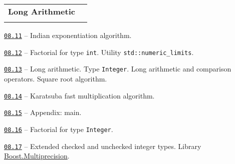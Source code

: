 \documentclass[a4paper,12pt]{article}
\renewenvironment{itemize}
{
    \begin{list}{\labelitemi}
    {
      \setlength{\topsep}{0pt}
      \setlength{\partopsep}{0pt}
      \setlength{\parskip}{0pt}
      \setlength{\itemsep}{0pt}
      \setlength{\parsep}{0pt}
      \setlength{\leftmargin}{14.5pt}
    }
}{\end{list}}
\begin{document}
\bigskip\medskip

\begin{tabular}{!{\vrule width 1pt}L{3.3cm}!{\vrule width 1pt}L{15.7cm}!{\vrule width 0pt}} 


\textbf{Long Arithmetic} & \\


\end{tabular}

\medskip\smallskip

\begin{itemize}

    \item \href{https://github.com/i-s-m-mipt/Education/blob/master/projects/examples/source/08.11.cpp}{\texttt{08.11}} -- Indian exponentiation algorithm.

    \smallskip

    \item \href{https://github.com/i-s-m-mipt/Education/blob/master/projects/examples/source/08.12.cpp}{\texttt{08.12}} -- Factorial for type \lstinline{int}. Utility \lstinline{std::numeric_limits}.

    \smallskip

    \item \href{https://github.com/i-s-m-mipt/Education/blob/master/projects/examples/source/08.13.hpp}{\texttt{08.13}} -- Long arithmetic. Type \lstinline{Integer}. Long arithmetic and comparison operators. Square root algorithm.

    \smallskip

    \item \href{https://github.com/i-s-m-mipt/Education/blob/master/projects/examples/source/08.14.pdf}{\texttt{08.14}} -- Karatsuba fast multiplication algorithm. 

    \smallskip

    \item \href{https://github.com/i-s-m-mipt/Education/blob/master/projects/examples/source/08.15.cpp}{\texttt{08.15}} -- Appendix: main. 

    \smallskip

    \item \href{https://github.com/i-s-m-mipt/Education/blob/master/projects/examples/source/08.16.cpp}{\texttt{08.16}} -- Factorial for type \lstinline{Integer}. 

    \smallskip

    \item \href{https://github.com/i-s-m-mipt/Education/blob/master/projects/examples/source/08.17.cpp}{\texttt{08.17}} -- Extended checked and unchecked integer types. Library \href{https://www.boost.org/doc/libs/1_84_0/libs/multiprecision/doc/html/index.html}{Boost.Multiprecision}.


\end{itemize}
\end{document}
